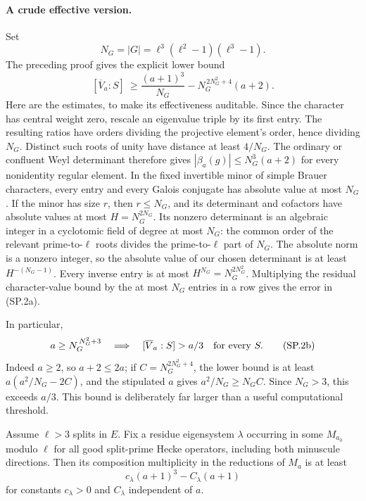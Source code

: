 \paragraph{A crude effective version.}
Set
\[
                  N_G=|G|=\ell^3(\ell^2-1)(\ell^3-1).
\]
The preceding proof gives the explicit lower bound
\[
 [\overline V_a:S]\ \geq
 \frac{(a+1)^3}{N_G}
       -N_G^{\,2N_G^2+4}(a+2).
                                                               \tag{SP.2a}
\]
Here are the estimates, to make its effectiveness auditable.
Since the character has central weight zero, rescale an
eigenvalue triple by its first entry. The resulting ratios
have orders dividing the projective element's order, hence
dividing $N_G$. Distinct such roots of unity have distance
at least $4/N_G$. The ordinary or confluent Weyl determinant
therefore gives
$|\beta_a(g)|\leq N_G^3(a+2)$ for every nonidentity regular
element. In the fixed invertible minor of simple Brauer
characters, every entry and every Galois conjugate has
absolute value at most $N_G$. If the minor has size $r$,
then $r\leq N_G$, and its determinant and cofactors have
absolute values at most
$H=N_G^{2N_G}$. Its nonzero determinant is an algebraic
integer in a cyclotomic field of degree at most $N_G$:
the common order of the relevant prime-to-$\ell$ roots
divides the prime-to-$\ell$ part of $N_G$.
The absolute norm is a nonzero integer, so the absolute
value of our chosen determinant is at least
$H^{-(N_G-1)}$. Every inverse entry is at most
$H^{N_G}=N_G^{2N_G^2}$.
Multiplying the residual character-value bound by the at
most $N_G$ entries in a row gives the error in (SP.2a).

In particular,
\[
                  a\geq N_G^{\,N_G^2+3}
        \quad\Longrightarrow\quad
                       [\overline V_a:S]>a/3
                           \quad\hbox{for every }S.
                                                               \tag{SP.2b}
\]
Indeed $a\geq2$, so $a+2\leq2a$; if
$C=N_G^{2N_G^2+4}$, the lower bound is at least
$a(a^2/N_G-2C)$, and the stipulated $a$ gives
$a^2/N_G\geq N_G C$. Since $N_G>3$, this exceeds $a/3$.
This bound is deliberately far larger than a useful
computational threshold.

\begin{lemma}
Assume $\ell>3$ splits in $E$. Fix a residue eigensystem
$\lambda$ occurring in some $M_{a_0}$ modulo $\ell$ for
all good split-prime Hecke operators, including both
minuscule directions. Then its composition multiplicity
in the reductions of $M_a$ is at least
\[
                            c_\lambda(a+1)^3-C_\lambda(a+1)
                                                               \tag{SP.5}
\]
for constants $c_\lambda>0$ and $C_\lambda$ independent
of $a$.
\end{lemma}

